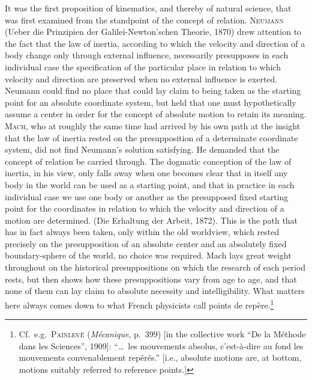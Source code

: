 \documentclass[12pt]{article}
\newcommand{\opage}[1]{\marginnote{\footnotesize\textit{[#1]}}}
\begin{document}
It was the first proposition of kinematics, and thereby of natural
science, that was first examined from the standpoint of the concept of
relation. \textsc{Neumann} (Ueber die Prinzipien der Galilei-Newton'schen
Theorie, 1870) drew attention to the fact that the law of inertia,
according to which the velocity and direction of a body change only through
external influence, necessarily presupposes in each individual case the
specification of the particular place in relation to which velocity and
direction are preserved when no external influence is exerted. Neumann
could find no place that could lay claim to being taken as the starting
point for an absolute coordinate system, but held that one must
hypothetically assume a center in order for the concept of absolute motion
to retain its meaning. \textsc{Mach}, who at roughly the same time had arrived by
his own path at the insight that the law of inertia rested on the
presupposition of a determinate coordinate system, did not find Neumann's
solution satisfying. He demanded that the concept of relation be carried
through. The dogmatic conception of the law of inertia, in his view, only
falls away when one becomes clear that in itself any body in the world can
be used as a starting point, and that in practice in each \opage{73}individual case
we use one body or another as the presupposed fixed starting point for the
coordinates in relation to which the velocity and direction of a motion are
determined. (Die Erhaltung der Arbeit, 1872). This is the path that
has in fact always been taken, only within the old worldview, which rested
precisely on the presupposition of an absolute center and an absolutely
fixed boundary-sphere of the world, no choice was required. Mach lays
great weight throughout on the historical presuppositions on which the
research of each period rests, but then shows how these presuppositions
vary from age to age, and that none of them can lay claim to absolute
necessity and intelligibility. What matters here always comes down to what
French physicists call points de repère.\footnote{Cf.\ e.g.\
  \textsc{Painlevé} (\textit{Mécanique}, p.~399) [in the collective work
  ``De la Méthode dans les Sciences'', 1909]: ``\ldots\ les mouvements
  absolus, c'est-à-dire au fond les mouvements convenablement repérés.''
  [i.e., absolute motions are, at bottom, motions suitably referred to
  reference points.]}
\end{document}
